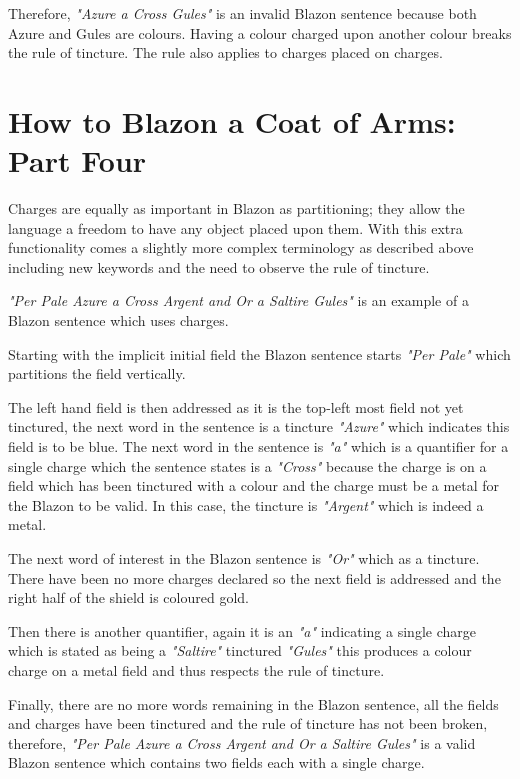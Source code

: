 Therefore, \emph{"Azure a Cross Gules"} is an invalid Blazon sentence because both Azure and Gules are colours. Having a colour charged upon another colour breaks the rule of tincture.  The rule also applies to charges placed on charges. 





\section{How to Blazon a Coat of Arms: Part Four}

Charges are equally as important in Blazon as partitioning; they allow the language a freedom to have any object placed upon them. With this extra functionality comes a slightly more complex terminology as described above including new keywords and the need to observe the rule of tincture.  

\emph{"Per Pale Azure a Cross Argent and Or a Saltire Gules"} is an example of a Blazon sentence which uses charges.

Starting with the implicit initial field the Blazon sentence starts \emph{"Per Pale"} which partitions the field vertically. 

The left hand field is then addressed as it is the top-left most field not yet tinctured, the next word in the sentence is a tincture \emph{"Azure"} which indicates this field is to be blue.  The next word in the sentence is \emph{"a"} which is a quantifier for a single charge which the sentence states is a \emph{"Cross"} because the charge is on a field which has been tinctured with a colour and the charge must be a metal for the Blazon to be valid. In this case, the tincture is \emph{"Argent"} which is indeed a metal.  

The next word of interest in the Blazon sentence is \emph{"Or"} which as a tincture.  
There have been no more charges declared so  the next field is addressed and the right half of the shield is coloured gold.

Then there is another quantifier, again it is an \emph{"a"} indicating a single charge which is stated as being a \emph{"Saltire"} tinctured \emph{"Gules"} this produces a colour charge on a metal field and thus respects the rule of tincture.  

Finally, there are no more words remaining in the Blazon sentence, all the fields and charges have been tinctured and the rule of tincture has not been broken, therefore, \emph{"Per Pale Azure a Cross Argent and Or a Saltire Gules"} is a valid Blazon sentence which contains two fields each with a single charge. 


